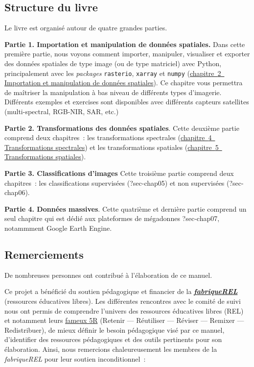 \documentclass[
]{article}
\begin{document}
\label{sect004}
\subsection*{Structure du livre}\label{structure-du-livre}

Le livre est organisé autour de quatre grandes parties.

\textbf{Partie 1. Importation et manipulation de données spatiales.}
Dans cette première partie, nous voyons comment importer, manipuler,
visualiser et exporter des données spatiales de type image (ou de type
matriciel) avec Python, principalement avec les \emph{packages}
\texttt{rasterio}, \texttt{xarray} et \texttt{numpy}
(\href{01-ImportationManipulationImages.html}{chapitre~{2~ Importation
et manipulation de données spatiales}}). Ce chapitre vous permettra de
maîtriser la manipulation à bas niveau de différents types d'imagerie.
Différents exemples et exercises sont disponibles avec différents
capteurs satellites (multi-spectral, RGB-NIR, SAR, etc.)

\textbf{Partie 2. Transformations des données spatiales}. Cette deuxième
partie comprend deux chapitres~: les transformations spectrales
(\href{03-TransformationSpectrales.html}{chapitre~{4~ Transformations
spectrales}}) et les transformations spatiales
(\href{04-TransformationSpatiales.html}{chapitre~{5~ Transformations
spatiales}}).

\textbf{Partie 3. Classifications d'images} Cette troisième partie
comprend deux chapitres~: les classifications supervisées
({?sec-chap05}) et non supervisées ({?sec-chap06}).

\textbf{Partie 4. Données massives}. Cette quatrième et dernière partie
comprend un seul chapitre qui est dédié aux plateformes de mégadonnes
{?sec-chap07}, notammment Google Earth Engine.

\label{sect005}
\subsection*{Remerciements}\label{remerciements}

De nombreuses personnes ont contribué à l'élaboration de ce manuel.

Ce projet a bénéficié du soutien pédagogique et financier de la
\href{https://fabriquerel.org/}{\textbf{\emph{fabriqueREL}}} (ressources
éducatives libres). Les différentes rencontres avec le comité de suivi
nous ont permis de comprendre l'univers des ressources éducatives libres
(REL) et notamment leurs \href{https://fabriquerel.org/rel/}{fameux 5R}
(Retenir --- Réutiliser --- Réviser --- Remixer --- Redistribuer), de
mieux définir le besoin pédagogique visé par ce manuel, d'identifier des
ressources pédagogiques et des outils pertinents pour son élaboration.
Ainsi, nous remercions chaleureusement les membres de la
\emph{fabriqueREL} pour leur soutien inconditionnel~:
\end{document}

